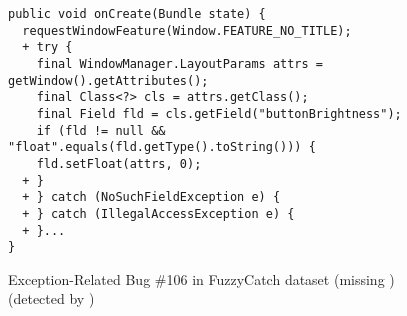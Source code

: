 \begin{figure}[t]%
	\centering
\begin{lstlisting}[]
public void onCreate(Bundle state) {
  requestWindowFeature(Window.FEATURE_NO_TITLE);
  + try {
    final WindowManager.LayoutParams attrs = getWindow().getAttributes();
    final Class<?> cls = attrs.getClass();
    final Field fld = cls.getField("buttonBrightness");
    if (fld != null && "float".equals(fld.getType().toString())) {
    fld.setFloat(attrs, 0);
  + }
  + } catch (NoSuchFieldException e) {
  + } catch (IllegalAccessException e) {
  + }...
}
\end{lstlisting}
        \vspace{-16pt}
        \caption{Exception-Related Bug \#106 in FuzzyCatch dataset (missing ) (detected by {\tool})}
        \label{fig:example-bug}
\end{figure}
